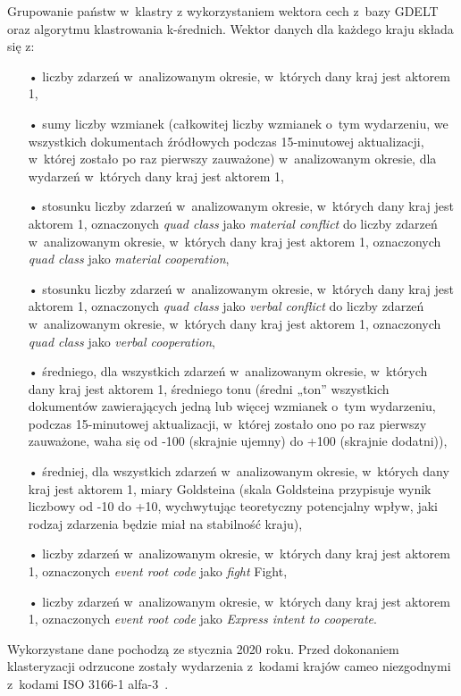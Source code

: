 \documentclass[11pt]{report}
\begin{document}
    Grupowanie państw w~klastry z wykorzystaniem wektora cech z~bazy GDELT oraz algorytmu klastrowania k-średnich.
    Wektor danych dla każdego kraju składa się z:
    \begin{enumerate}
        \item[•] liczby zdarzeń w~analizowanym okresie, w~których dany kraj jest aktorem 1,
        \item[•] sumy liczby wzmianek (całkowitej liczby wzmianek o~tym wydarzeniu, we wszystkich dokumentach źródłowych podczas 15-minutowej aktualizacji, w~której zostało po raz pierwszy zauważone) w~analizowanym okresie, dla wydarzeń w~których dany kraj jest aktorem 1,
        \item[•] stosunku liczby zdarzeń w~analizowanym okresie, w~których dany kraj jest aktorem 1, oznaczonych \textit{quad class} jako \textit{material conflict} do liczby zdarzeń w~analizowanym okresie, w~których dany kraj jest aktorem 1, oznaczonych \textit{quad class} jako \textit{material cooperation},
        \item[•] stosunku liczby zdarzeń w~analizowanym okresie, w~których dany kraj jest aktorem 1, oznaczonych \textit{quad class} jako \textit{verbal conflict} do liczby zdarzeń w~analizowanym okresie, w~których dany kraj jest aktorem 1, oznaczonych \textit{quad class} jako \textit{verbal cooperation},
        \item[•] średniego, dla wszystkich zdarzeń w~analizowanym okresie, w~których dany kraj jest aktorem 1, średniego tonu (średni „ton” wszystkich dokumentów zawierających jedną lub więcej wzmianek o~tym wydarzeniu, podczas 15-minutowej aktualizacji, w~której zostało ono po raz pierwszy zauważone, waha się od -100 (skrajnie ujemny) do +100 (skrajnie dodatni)),
        \item[•] średniej, dla wszystkich zdarzeń w~analizowanym okresie, w~których dany kraj jest aktorem 1, miary Goldsteina (skala Goldsteina przypisuje wynik liczbowy od -10 do +10, wychwytując teoretyczny potencjalny wpływ, jaki rodzaj zdarzenia będzie miał na stabilność kraju),
        \item[•] liczby zdarzeń w~analizowanym okresie, w~których dany kraj jest aktorem 1, oznaczonych \textit{event root code} jako \textit{fight} Fight,
        \item[•] liczby zdarzeń w~analizowanym okresie, w~których dany kraj jest aktorem 1, oznaczonych \textit{event root code} jako \textit{Express intent to cooperate}.
    \end{enumerate}
    Wykorzystane dane pochodzą ze stycznia 2020 roku.
    Przed dokonaniem klasteryzacji odrzucone zostały wydarzenia z~kodami krajów cameo niezgodnymi z~kodami ISO 3166-1 alfa-3~\cite{iso_alfa3}.
\end{document}

